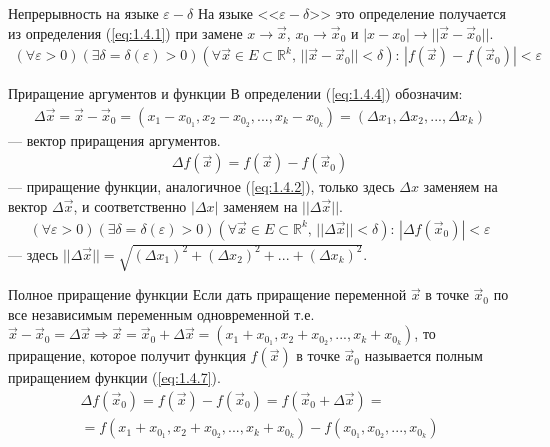 \begin{tbox}{Непрерывность на языке $\varepsilon - \delta$}
	На языке <<$\varepsilon - \delta$>> это определение получается из определения (\ref{eq:1.4.1}) при замене $x \to \vec{x}$, $x_0 \to \vec{x}_0$ и $|x - x_0| \to ||\vec{x} - \vec{x}_0||$.
	\begin{align} \label{eq:1.4.4}
		(\forall \varepsilon > 0)(\exists \delta = \delta(\varepsilon) > 0)(\forall \vec{x} \in E \subset \mathbb{R}^k, \, ||\vec{x} - \vec{x}_0|| < \delta): \, |f(\vec{x}) - f(\vec{x}_0)| < \varepsilon
	\end{align}
\end{tbox}

\begin{tbox}{Приращение аргументов и функции}
	В определении (\ref{eq:1.4.4}) обозначим:
	\begin{align}
		\Delta \vec{x} = \vec{x} - \vec{x}_0 = (x_1 - x_\text{$0_1$}, x_2 - x_\text{$0_2$}, ..., x_k - x_\text{$0_k$}) = (\Delta x_1, \Delta x_2, ..., \Delta x_k)
	\end{align}
	--- вектор приращения аргументов.
	\begin{align} \label{eq:1.4.5}
		\Delta f(\vec{x}) = f(\vec{x}) - f(\vec{x}_0)
	\end{align}
	--- приращение функции, аналогичное (\ref{eq:1.4.2}), только здесь $\Delta x$ заменяем на вектор $\Delta \vec{x}$, и соответственно $|\Delta x|$ заменяем на $||\Delta \vec{x}||$.
	\begin{align} \label{eq:1.4.6}
		(\forall \varepsilon > 0)(\exists \delta = \delta(\varepsilon) > 0)(\forall \vec{x} \in E \subset \mathbb{R}^k, \, ||\Delta \vec{x}|| < \delta): \, |\Delta f(\vec{x}_0)| < \varepsilon
	\end{align}
	--- здесь \(||\Delta \vec{x}|| = \sqrt{(\Delta x_1)^2 + (\Delta x_2)^2 + ... + (\Delta x_k)^2}\).
\end{tbox}

\begin{tbox}{Полное приращение функции}
	Если дать приращение переменной $\vec{x}$ в точке $\vec{x}_0$ по все независимым переменным одновременной т.е. $\vec{x} - \vec{x}_0 = \Delta \vec{x} \Rightarrow \vec{x} = \vec{x}_0 + \Delta \vec{x} = (x_1 + x_\text{$0_1$}, x_2 + x_\text{$0_2$}, ..., x_k + x_\text{$0_k$})$, то приращение, которое получит функция $f(\vec{x})$ в точке $\vec{x}_0$ называется полным приращением функции (\ref{eq:1.4.7}).
	\begin{multline} \label{eq:1.4.7}
		\Delta f(\vec{x}_0) = f(\vec{x}) - f(\vec{x}_0) = f(\vec{x}_0 + \Delta \vec{x}) =\\= f(x_1 + x_\text{$0_1$}, x_2 + x_\text{$0_2$}, ..., x_k + x_\text{$0_k$}) - f(x_\text{$0_1$}, x_\text{$0_2$}, ..., x_\text{$0_k$})
	\end{multline}
\end{tbox}

